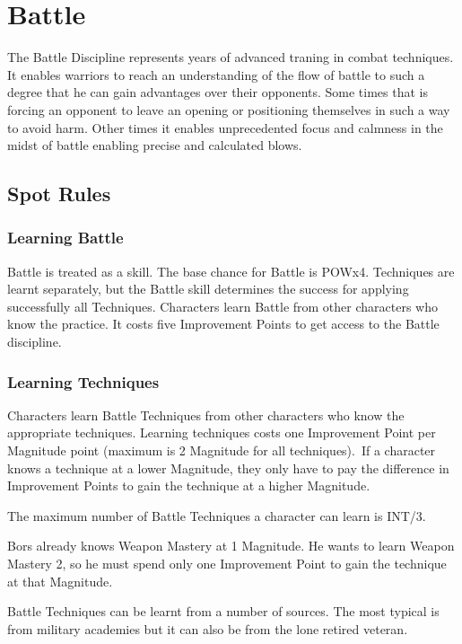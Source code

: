 \chapter{Battle}
\label{ch:battle}

The Battle Discipline represents years of advanced traning in combat techniques. It enables warriors to reach an understanding of the flow of battle to such a degree that he can gain advantages over their opponents. Some times that is forcing an opponent to leave an opening or positioning themselves in such a way to avoid harm. Other times it enables unprecedented focus and calmness in the midst of battle enabling precise and calculated blows.


\section{Spot Rules}

\subsection{Learning Battle}
Battle is treated as a skill. The base chance for Battle is POWx4. Techniques are learnt separately, but the Battle skill determines the success for applying successfully all Techniques. Characters learn Battle from other characters who know the practice. It costs five Improvement Points to get access to the Battle discipline.

\subsection{Learning Techniques}
Characters learn Battle Techniques from other characters who know the appropriate techniques. Learning techniques costs one Improvement Point per Magnitude point (maximum is 2 Magnitude for all techniques). If a character knows a technique at a lower Magnitude, they only have to pay the difference in Improvement Points to gain the technique at a higher Magnitude.

The maximum number of Battle Techniques a character can learn is INT/3.

\begin{rpg-examplebox}
Bors already knows Weapon Mastery at 1 Magnitude. He wants to learn Weapon Mastery 2, so he must spend only one Improvement Point to gain the technique at that Magnitude.
\end{rpg-examplebox}

Battle Techniques can be learnt from a number of sources. The most typical is from military academies but it can also be from the lone retired veteran. 

